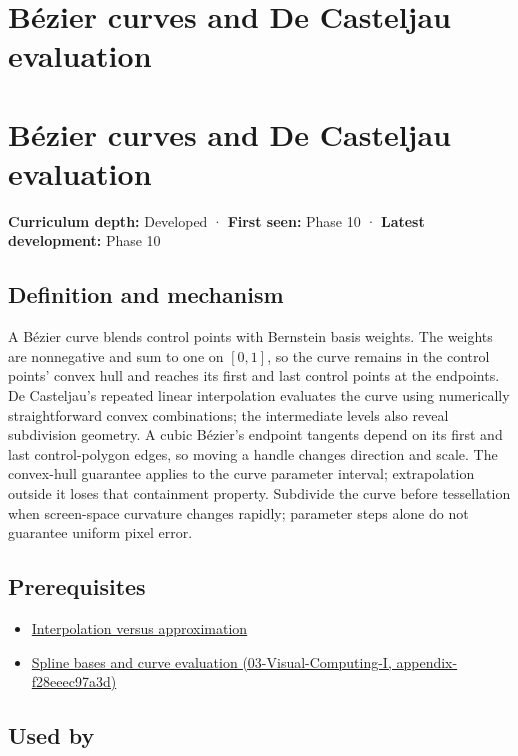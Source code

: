 \hypertarget{appendix-ddbec701898c}{}
\section*{Bézier curves and De Casteljau evaluation}
\section{Bézier curves and De Casteljau evaluation}\label{buxe9zier-curves-and-de-casteljau-evaluation}

\textbf{Curriculum depth:} Developed · \textbf{First seen:} Phase 10 · \textbf{Latest development:} Phase 10

\subsection{Definition and mechanism}\label{definition-and-mechanism}

A Bézier curve blends control points with Bernstein basis weights. The weights are nonnegative and sum to one on \([0,1]\), so the curve remains in the control points' convex hull and reaches its first and last control points at the endpoints. De Casteljau's repeated linear interpolation evaluates the curve using numerically straightforward convex combinations; the intermediate levels also reveal subdivision geometry. A cubic Bézier's endpoint tangents depend on its first and last control-polygon edges, so moving a handle changes direction and scale. The convex-hull guarantee applies to the curve parameter interval; extrapolation outside it loses that containment property. Subdivide the curve before tessellation when screen-space curvature changes rapidly; parameter steps alone do not guarantee uniform pixel error.

\subsection{Prerequisites}\label{prerequisites}

\begin{itemize}
\tightlist
\item
  \hyperref[appendix-0c2a5f69851e]{Interpolation versus approximation}
\item
  \href{}{Spline bases and curve evaluation (03-Visual-Computing-I, appendix-f28eeec97a3d)}
\end{itemize}

\subsection{Used by}\label{used-by}

